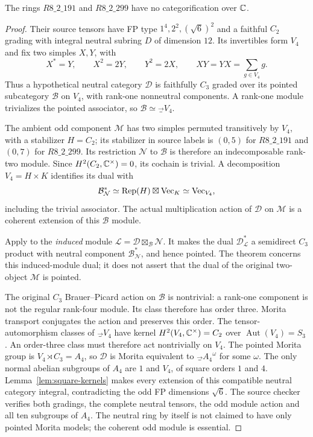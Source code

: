 \begin{proposition}\label{prop:dimension24}
The rings $R8\_2\_191$ and $R8\_2\_299$ have no categorification over $\mathbb C$.
\end{proposition}
\nopagebreak[4]
\begin{proof}
Their source tensors have FP type $1^4,2^2,(\sqrt6)^2$ and a faithful
$C_2$ grading with integral neutral subring $D$ of dimension $12$.
Its invertibles form $V_4$ and fix two simples $X,Y$, with
\[
X^*=Y,\qquad X^2=2Y,\qquad Y^2=2X,\qquad
XY=YX=\sum_{g\in V_4}g.
\]
Thus a hypothetical neutral category $\mathcal D$ is faithfully
$C_3$ graded over its pointed subcategory $\mathcal B$ on $V_4$,
with rank-one nonneutral components. A rank-one module trivializes
the pointed associator, so $\mathcal B\simeq\Vec_{V_4}$.

The ambient odd component $\mathcal M$ has two simples permuted
transitively by $V_4$, with a stabilizer $H=C_2$; its stabilizer in
source labels is $(0,5)$ for $R8\_2\_191$ and $(0,7)$ for
$R8\_2\_299$. Its restriction $\mathcal N$ to $\mathcal B$ is
therefore an indecomposable rank-two module. Since
$H^2(C_2,\mathbb C^\times)=0$, its cochain is trivial. A decomposition
$V_4=H\times K$ identifies its dual with
\[
\mathcal B^*_{\mathcal N}
\simeq\operatorname{Rep}(H)\boxtimes\operatorname{Vec}_K\simeq\operatorname{Vec}_{V_4},
\]
including the trivial associator.
The actual multiplication action of $\mathcal D$ on $\mathcal M$
is a coherent extension of this $\mathcal B$ module.

Apply \cite[Theorem~1.3]{GalindoClifford} to the \emph{induced} module
$\mathcal L=\mathcal D\boxtimes_{\mathcal B}\mathcal N$.
It makes the dual $\mathcal D^*_{\mathcal L}$ a semidirect $C_3$
product with neutral component $\mathcal B^*_{\mathcal N}$, and
hence pointed. The theorem concerns this induced-module dual;
it does not assert that the dual of the original two-object
$\mathcal M$ is pointed.

The original $C_3$ Brauer--Picard action on $\mathcal B$ is nontrivial:
a rank-one component is not the regular rank-four module. Its class
therefore has order three. Morita transport conjugates the action and
preserves this order. The tensor-automorphism classes of $\Vec_{V_4}$
have kernel $H^2(V_4,\mathbb C^\times)=C_2$ over
$\operatorname{Aut}(V_4)=S_3$ \cite{EGNO}. An order-three class must
therefore act nontrivially on $V_4$. The pointed Morita group is
$V_4\rtimes C_3=A_4$, so $\mathcal D$ is Morita equivalent to
$\Vec_{A_4}^\omega$ for some $\omega$.
The only normal abelian subgroups of $A_4$ are $1$ and $V_4$, of
square orders $1$ and $4$. Lemma~\ref{lem:square-kernels} makes every
extension of this compatible neutral category integral, contradicting
the odd FP dimensions $\sqrt6$. The source checker verifies both
gradings, the complete neutral tensors, the odd module action and
all ten subgroups of $A_4$. The neutral ring by itself is not claimed
to have only pointed Morita models; the coherent odd module is essential.
\end{proof}

